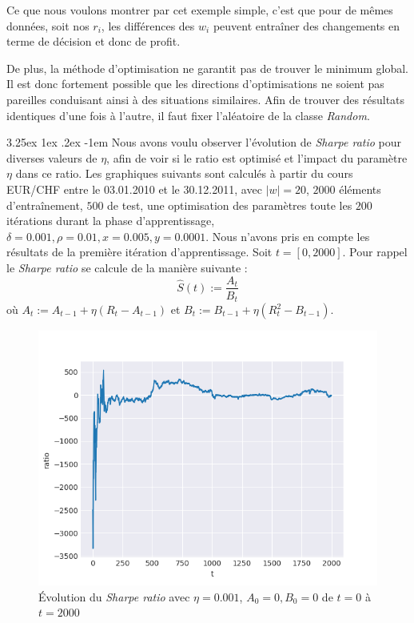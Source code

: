 \documentclass[a4paper, 11pt]{article}
\makeatletter
\renewcommand\paragraph{\@startsection{paragraph}{5}{\z@}%
  {3.25ex \@plus1ex \@minus.2ex}%
  {-1em}%
  {\normalfont\normalsize\bfseries}}
\makeatother
\begin{document}
Ce que nous voulons montrer par cet exemple simple, c'est que pour de mêmes données, soit nos $r_i$, les différences des $w_i$ peuvent entraîner des changements en terme de décision et donc de profit.

De plus, la méthode d'optimisation ne garantit pas de trouver le minimum global. Il est donc fortement possible que les directions d'optimisations ne soient pas pareilles conduisant ainsi à des situations similaires. Afin de trouver des résultats identiques d'une fois à l'autre, il faut fixer l'aléatoire de la classe \textit{Random}.
 
 
 \paragraph{}
 Nous avons voulu observer l'évolution de \textit{Sharpe ratio} pour diverses valeurs de $\eta$, afin de voir si le ratio est optimisé et l'impact
 du paramètre $\eta$ dans ce ratio. Les graphiques suivants sont calculés à partir du cours EUR/CHF entre le 03.01.2010 et le 30.12.2011, avec 
 $|w| = 20$, $2000$ éléments d'entraînement, $500$ de test, une optimisation des
paramètres toute les $200$ itérations durant la phase d'apprentissage, $\delta = 0.001, \rho=0.01, x = 0.005, y=0.0001$. Nous n'avons pris en compte 
les résultats de la première itération d'apprentissage. Soit $t= [0,2000]$.
Pour rappel le \textit{Sharpe ratio} se calcule de la manière suivante :
$$\widehat{S}(t) := \frac{A_t}{B_t}$$
où $A_t := A_{t-1} + \eta (R_t - A_{t-1})$ et $B_t := B_{t-1} + \eta (R_t^2 - B_{t-1})$.


  \begin{figure}[H]
\centering
\includegraphics[]{images/res/exemple_eta_0001}
\caption[Blup]{Évolution du \textit{Sharpe ratio} avec $\eta = 0.001$, $A_0 = 0, B_0 = 0$ de $t=0$ à $t=2000$}
\end{figure}
\end{document}
